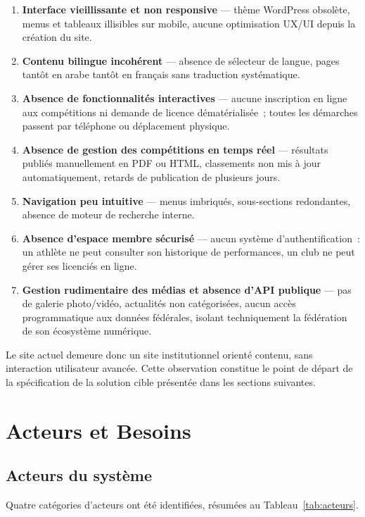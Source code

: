 \documentclass[conference]{IEEEtran}
\begin{document}
\begin{enumerate}
\item \textbf{Interface vieillissante et non responsive} — thème WordPress obsolète, menus et tableaux illisibles sur mobile, aucune optimisation UX/UI depuis la création du site.
\item \textbf{Contenu bilingue incohérent} — absence de sélecteur de langue, pages tantôt en arabe tantôt en français sans traduction systématique.
\item \textbf{Absence de fonctionnalités interactives} — aucune inscription en ligne aux compétitions ni demande de licence dématérialisée~; toutes les démarches passent par téléphone ou déplacement physique.
\item \textbf{Absence de gestion des compétitions en temps réel} — résultats publiés manuellement en PDF ou HTML, classements non mis à jour automatiquement, retards de publication de plusieurs jours.
\item \textbf{Navigation peu intuitive} — menus imbriqués, sous-sections redondantes, absence de moteur de recherche interne.
\item \textbf{Absence d'espace membre sécurisé} — aucun système d'authentification~: un athlète ne peut consulter son historique de performances, un club ne peut gérer ses licenciés en ligne.
\item \textbf{Gestion rudimentaire des médias et absence d'API publique} — pas de galerie photo/vidéo, actualités non catégorisées, aucun accès programmatique aux données fédérales, isolant techniquement la fédération de son écosystème numérique.
\end{enumerate}

Le site actuel demeure donc un site institutionnel orienté contenu, sans interaction utilisateur avancée. Cette observation constitue le point de départ de la spécification de la solution cible présentée dans les sections suivantes.

\section{Acteurs et Besoins}
\subsection{Acteurs du système}
Quatre catégories d'acteurs ont été identifiées, résumées au Tableau~\ref{tab:acteurs}.
\end{document}
